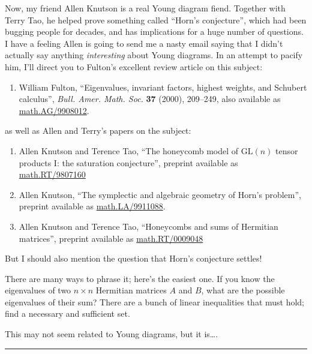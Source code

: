 \documentclass{article}
\def\tightlist{}
\begin{document}
Now, my friend Allen Knutson is a real Young diagram fiend. Together
with Terry Tao, he helped prove something called ``Horn's conjecture'',
which had been bugging people for decades, and has implications for a
huge number of questions. I have a feeling Allen is going to send me a
nasty email saying that I didn't actually say anything
\emph{interesting} about Young diagrams. In an attempt to pacify him,
I'll direct you to Fulton's excellent review article on this subject:

\begin{enumerate}
\def\labelenumi{\arabic{enumi})}
\setcounter{enumi}{7}
\tightlist
\item
  William Fulton, ``Eigenvalues, invariant factors, highest weights, and
  Schubert calculus'', \emph{Bull. Amer. Math. Soc.} \textbf{37} (2000),
  209--249, also available as
  \href{http://arXiv.org/abs/math.AG/9908012}{math.AG/9908012}.
\end{enumerate}

as well as Allen and Terry's papers on the subject:

\begin{enumerate}
\def\labelenumi{\arabic{enumi})}
\setcounter{enumi}{8}
\item
  Allen Knutson and Terence Tao, ``The honeycomb model of
  \(\mathrm{GL}(n)\) tensor products I: the saturation conjecture'',
  preprint available as
  \href{http://arXiv.org/abs/math.RT/9807160}{math.RT/9807160}
\item
  Allen Knutson, ``The symplectic and algebraic geometry of Horn's
  problem'', preprint available as
  \href{http://arXiv.org/abs/math.LA/9911088}{math.LA/9911088}.
\item
  Allen Knutson and Terence Tao, ``Honeycombs and sums of Hermitian
  matrices'', preprint available as
  \href{http://arXiv.org/abs/math.RT/0009048}{math.RT/0009048}
\end{enumerate}

But I should also mention the question that Horn's conjecture settles!

There are many ways to phrase it; here's the easiest one. If you know
the eigenvalues of two \(n\times n\) Hermitian matrices \(A\) and \(B\),
what are the possible eigenvalues of their sum? There are a bunch of
linear inequalities that must hold; find a necessary and sufficient set.

This may not seem related to Young diagrams, but it is\ldots.

\begin{center}\rule{0.5\linewidth}{0.5pt}\end{center}
\end{document}
